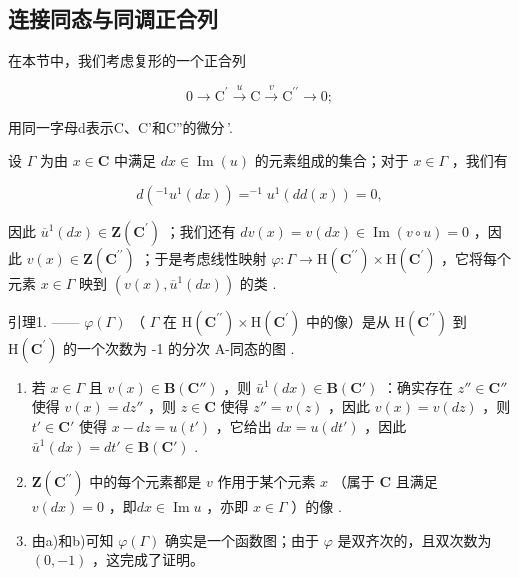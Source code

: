 \subsection{连接同态与同调正合列}

在本节中，我们考虑复形的一个正合列

\[
0 \longrightarrow \mathrm{C} ^ {\prime} \stackrel {u} {\longrightarrow} \mathrm{C} \stackrel {v} {\longrightarrow} \mathrm{C} ^ {\prime \prime} \longrightarrow 0;
\]

用同一字母d表示C、C'和C''的微分\,'.

设 \(\Gamma\) 为由 \(x \in \mathbf{C}\) 中满足 \(dx \in \operatorname{Im}(u)\) 的元素组成的集合；对于 \(x \in \Gamma\) ，我们有

\[
d \left(^ {- 1} u ^ {1} (d x)\right) = ^ {- 1} u ^ {1} (d d (x)) = 0,
\]

因此 \(\overline{u}^{1}(dx)\in\mathbf{Z}(\mathbf{C}^{\prime})\) ；我们还有 \(dv(x)=v(dx)\in\operatorname{Im}(v\circ u)=0\) ，因此 \(v(x)\in\mathbf{Z}(\mathbf{C}^{\prime\prime})\) ；于是考虑线性映射 \(\varphi:\Gamma\to\mathrm{H}(\mathbf{C}^{\prime\prime})\times\mathrm{H}(\mathbf{C}^{\prime})\) ，它将每个元素 \(x\in\Gamma\) 映到 \((v(x),\overline{u}^{1}(dx))\) 的类 .

引理1. —— \(\varphi(\Gamma)\) （ \(\Gamma\) 在 \(\mathrm{H}(\mathbf{C}^{\prime\prime}) \times \mathrm{H}(\mathbf{C}^{\prime})\) 中的像）是从 \(\mathrm{H}(\mathbf{C}^{\prime\prime})\) 到 \(\mathrm{H}(\mathbf{C}^{\prime})\) 的一个次数为 -1 的分次 A-同态的图 .

\begin{enumerate}
\def\labelenumi{\alph{enumi})}
\item
  若 \(x \in \Gamma\) 且 \(v(x) \in \mathbf{B}(\mathbf{C}'')\) ，则 \(\bar{u}^1(dx) \in \mathbf{B}(\mathbf{C}')\) ：确实存在 \(z'' \in \mathbf{C}''\) 使得 \(v(x) = dz''\) ，则 \(z \in \mathbf{C}\) 使得 \(z'' = v(z)\) ，因此 \(v(x) = v(dz)\) ，则 \(t' \in \mathbf{C}'\) 使得 \(x - dz = u(t')\) ，它给出 \(dx = u(dt')\) ，因此 \(\bar{u}^1(dx) = dt' \in \mathbf{B}(\mathbf{C}')\) .
\item
  \(\mathbf{Z}(\mathbf{C}^{\prime \prime})\) 中的每个元素都是 \(v\) 作用于某个元素 \(x\) （属于 \(\mathbf{C}\) 且满足 \(v(dx) = 0\) ，即\(dx \in \operatorname{Im} u\) ，亦即 \(x \in \Gamma\) ）的像 .
\item
  由a)和b)可知 \(\varphi(\Gamma)\) 确实是一个函数图；由于 \(\varphi\) 是双齐次的，且双次数为 \((0, -1)\) ，这完成了证明。
\end{enumerate}

